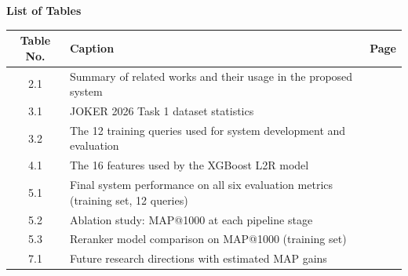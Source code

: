 \thispagestyle{plain}
\begin{center}
    \Large \textbf{List of Tables}
\end{center}

\vspace{1em}

\begin{center}
\begin{tabular}{|c|p{9.5cm}|c|}
\hline
\textbf{Table No.} & \textbf{Caption} & \textbf{Page} \\
\hline
2.1 & Summary of related works and their usage in the proposed system & \pageref{tab:related} \\
\hline
3.1 & JOKER 2026 Task 1 dataset statistics & \pageref{tab:dataset} \\
\hline
3.2 & The 12 training queries used for system development and evaluation & \pageref{tab:trainqueries} \\
\hline
4.1 & The 16 features used by the XGBoost L2R model & \pageref{tab:features} \\
\hline
5.1 & Final system performance on all six evaluation metrics (training set, 12 queries) & \pageref{tab:finalresults} \\
\hline
5.2 & Ablation study: MAP@1000 at each pipeline stage & \pageref{tab:ablation} \\
\hline
5.3 & Reranker model comparison on MAP@1000 (training set) & \pageref{tab:rerankers} \\
\hline
7.1 & Future research directions with estimated MAP gains & \pageref{tab:futurework} \\
\hline
\end{tabular}
\end{center}
